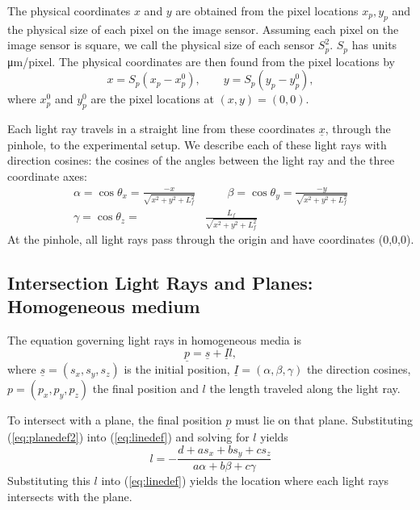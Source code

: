 \documentclass{svjour3}                     %
\begin{document}
The physical coordinates $x$ and $y$ are obtained from the pixel locations $x_p, y_p$  and the physical size of each pixel on the image sensor. Assuming each pixel on the image sensor is square, we call the physical size of each sensor $S_p^2$. $S_p$ has units \si[per-mode=symbol]{\micro\metre\per pixel}. The physical coordinates are then found from the pixel locations by %
\begin{equation}
	x = S_p (x_p-x_p^0), \qquad  y = S_p (y_p-y_p^0),
\end{equation}
where $x_p^0$ and $y_p^0$ are the pixel locations at $(x,y)=(0,0)$.

Each light ray travels in a straight line from these coordinates $\underline{x}$, through the pinhole, to the experimental setup. We describe each of these light rays with direction cosines: the cosines of the angles between the light ray and the three coordinate axes:
\begin{align}
\label{eq:directioncosines}
	\alpha = \cos \theta_x = \frac{-x}{\sqrt{x^2+y^2+L_f^2}} &\qquad
	\beta = \cos \theta_y = \frac{-y}{\sqrt{x^2+y^2+L_f^2}} \\
	\gamma = \cos \theta_z = &\frac{L_f}{\sqrt{x^2+y^2+L_f^2}} \nonumber
\end{align}
At the pinhole, all light rays pass through the origin and have coordinates (0,0,0). %

\subsection{Intersection Light Rays and Planes: Homogeneous medium}
The equation governing light rays in homogeneous media is
\begin{equation}
	\label{eq:linedef}
   \underline{p} = \underline{s} + \underline{I} l,
\end{equation}
where $\underline{s} = (s_x, s_y, s_z)$ is the initial position, $\underline{I} = (\alpha, \beta, \gamma)$ the direction cosines, $p = (p_x, p_y, p_z)$ the final position and $l$ the length traveled along the light ray. %

To intersect with a plane, the final position $\underline{p}$ must lie on that plane. Substituting (\ref{eq:planedef2}) into (\ref{eq:linedef}) and solving for $l$ yields 
\begin{equation}
	l = - \frac{d + a s_x + b s_y + c s_z}{a \alpha + b \beta + c \gamma}
\end{equation}
Substituting this $l$ into (\ref{eq:linedef}) yields the location where each light rays intersects with the plane.
\end{document}
